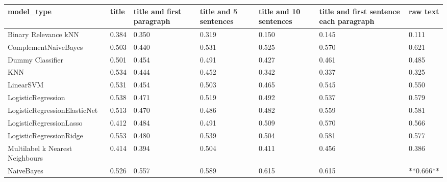 \begin{tabular}{lllllll}
\toprule
                     model\_type & title & title and first paragraph & title and 5 sentences & title and 10 sentences & title and first sentence each paragraph &  raw text \\
\midrule
           Binary Relevance kNN & 0.384 &                     0.350 &                 0.319 &                  0.150 &                                   0.145 &     0.111 \\
           ComplementNaiveBayes & 0.503 &                     0.440 &                 0.531 &                  0.525 &                                   0.570 &     0.621 \\
               Dummy Classifier & 0.501 &                     0.454 &                 0.491 &                  0.427 &                                   0.461 &     0.485 \\
                            KNN & 0.534 &                     0.444 &                 0.452 &                  0.342 &                                   0.337 &     0.325 \\
                      LinearSVM & 0.531 &                     0.454 &                 0.503 &                  0.465 &                                   0.545 &     0.550 \\
             LogisticRegression & 0.538 &                     0.471 &                 0.519 &                  0.492 &                                   0.537 &     0.579 \\
   LogisticRegressionElasticNet & 0.513 &                     0.470 &                 0.486 &                  0.482 &                                   0.559 &     0.581 \\
        LogisticRegressionLasso & 0.412 &                     0.484 &                 0.491 &                  0.509 &                                   0.570 &     0.566 \\
        LogisticRegressionRidge & 0.553 &                     0.480 &                 0.539 &                  0.504 &                                   0.581 &     0.577 \\
Multilabel k Nearest Neighbours & 0.414 &                     0.394 &                 0.504 &                  0.411 &                                   0.456 &     0.386 \\
                     NaiveBayes & 0.526 &                     0.557 &                 0.589 &                  0.615 &                                   0.615 & **0.666** \\

\end{tabular}
